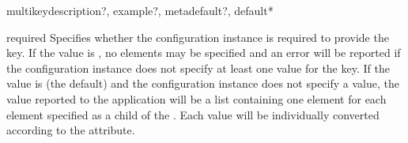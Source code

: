 \documentclass{howto}
\begin{document}
\begin{elementdesc}{multikey}{description?, example?, metadefault?, default*}
  \begin{attributedesc}{required}{}
    Specifies whether the configuration instance is required to
    provide the key.  If the value is , no 
    elements may be specified and an error will be reported if the
    configuration instance does not specify at least one value for the
    key.  If the value is  (the default) and the
    configuration instance does not specify a value, the value
    reported to the application will be a list containing one element
    for each  element specified as a child of the
    .  Each value will be individually converted
    according to the  attribute.
  \end{attributedesc}
\end{elementdesc}
\end{document}
